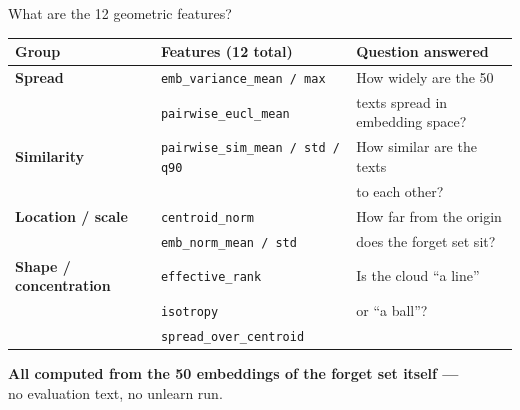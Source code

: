\documentclass[aspectratio=169,10pt]{beamer}
\begin{document}
\begin{frame}{What are the 12 geometric features?}
    \centering
    \footnotesize
    \begin{tabular}{@{}lll@{}}
        \toprule
        Group & Features (12 total) & Question answered \\
        \midrule
        \textbf{Spread}   & \texttt{emb\_variance\_mean / max}
            & How widely are the 50\\
                          & \texttt{pairwise\_eucl\_mean} & texts spread in embedding space? \\
        \midrule
        \textbf{Similarity} & \texttt{pairwise\_sim\_mean / std / q90}
            & How similar are the texts\\
                            & & to each other? \\
        \midrule
        \textbf{Location / scale} & \texttt{centroid\_norm}
            & How far from the origin\\
                                  & \texttt{emb\_norm\_mean / std} & does the forget set sit? \\
        \midrule
        \textbf{Shape / concentration} & \texttt{effective\_rank}
            & Is the cloud ``a line''\\
                                       & \texttt{isotropy} & or ``a ball''? \\
                                       & \texttt{spread\_over\_centroid} & \\
        \bottomrule
    \end{tabular}

    \vspace{0.8em}
    \begin{center}
        \normalsize
        \textbf{All computed from the 50 embeddings of the forget set itself ---}\\
        no evaluation text, no unlearn run.
    \end{center}
\end{frame}
\end{document}
